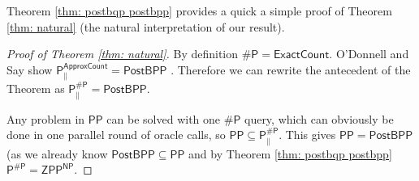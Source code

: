 \documentclass[10pt,a4paper]{article}
\begin{document}
Theorem \ref{thm: postbqp postbpp} provides a quick a simple proof of Theorem \ref{thm: natural} (the natural interpretation of our result).

\begin{proof}[Proof of Theorem \ref{thm: natural}]
By definition $\mathsf{\#P=ExactCount}$. O'Donnell and Say show $\mathsf{P^{ApproxCount}_{\parallel}=PostBPP}$ \cite{o2018weakness}. 
Therefore we can rewrite the antecedent of the Theorem as $\mathsf{P^{\#P}_\parallel=PostBPP}$.

Any problem in $\mathsf{PP}$ can be solved with one $\mathsf{\#P}$ query, which can obviously be done in one parallel round of oracle calls, so $\mathsf{PP\subseteq P^{\#P}_\parallel}$. This gives $\mathsf{PP=PostBPP}$ (as we already know $\mathsf{PostBPP\subseteq PP}$ and by Theorem \ref{thm: postbqp postbpp} $\mathsf{P^{\#P}=ZPP^{NP}}$.
\end{proof}
\end{document}
